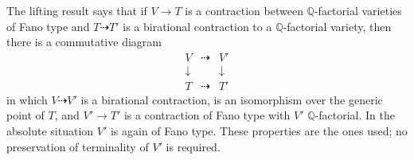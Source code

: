 \documentclass[11pt,reqno]{amsart}
\numberwithin{equation}{section}
\theoremstyle{definition}
\theoremstyle{remark}
\newcommand{\Q}{\mathbb Q}
\begin{document}
The lifting result \cite[Lemma~2.11]{MM} says that if $V\to T$ is a contraction between $\Q$-factorial varieties of Fano type and $T\dashrightarrow T'$ is a birational contraction to a $\Q$-factorial variety, then there is a commutative diagram
\[
\begin{array}{ccc}
 V&\dashrightarrow&V'\\
 \downarrow&&\downarrow\\
 T&\dashrightarrow&T'
\end{array}
\]
in which $V\dashrightarrow V'$ is a birational contraction, is an isomorphism over the generic point of $T$, and $V'\to T'$ is a contraction of Fano type with $V'$ $\Q$-factorial. In the absolute situation $V'$ is again of Fano type. These properties are the ones used; no preservation of terminality of $V'$ is required.
\end{document}
